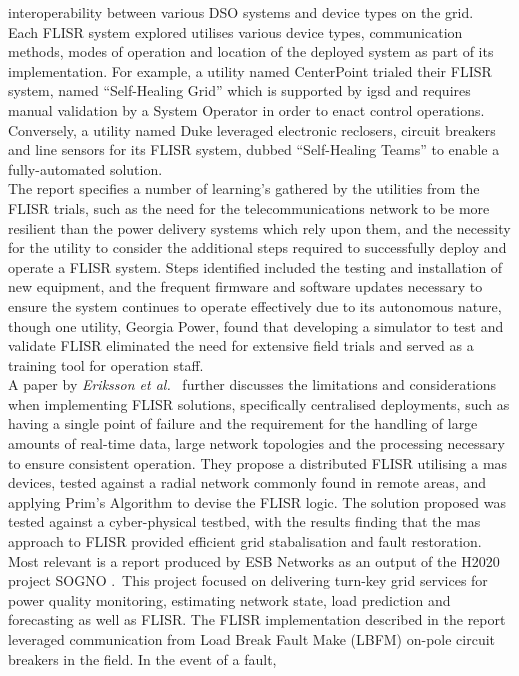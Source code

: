 interoperability between various DSO systems and device types on the grid.
\\
Each FLISR system explored utilises various device types, communication methods, modes of operation and location of the deployed system
as part of its implementation. For example, a utility named CenterPoint trialed their FLISR system, named ``Self-Healing Grid'' which is supported by \ac{igsd} and requires manual validation by a
System Operator in order to enact control operations. Conversely, a utility named Duke leveraged electronic reclosers, circuit breakers and line sensors for its FLISR system, dubbed ``Self-Healing Teams'' to enable a fully-automated solution.
\\
The report specifies a number of learning's gathered by the utilities from the FLISR trials, such as the need for the telecommunications network to be more resilient than the power delivery systems which rely upon them, and the necessity for
the utility to consider the additional steps required to successfully deploy and operate a FLISR system. Steps identified included the testing and installation of new equipment, and the frequent firmware and software updates necessary to ensure the system continues to operate
effectively due to its autonomous nature, though one utility, Georgia Power, found that developing a simulator to test and validate FLISR eliminated the need for extensive field trials and served as a training tool for operation staff.
\\
A paper by \textit{Eriksson et al.}\ \cite{7000578} further discusses the limitations and considerations when implementing FLISR solutions, specifically centralised deployments, such as having a single point of failure and the requirement for the handling of large amounts of real-time data, large network topologies and the processing necessary to ensure consistent operation. They propose a
distributed FLISR utilising a \ac{mas} devices, tested against a radial network commonly found in remote areas, and applying Prim's Algorithm to devise the FLISR logic. The solution proposed was tested against a
cyber-physical testbed, with the results finding that the \acs{mas} approach to FLISR provided efficient grid stabalisation and fault restoration.
\\
Most relevant is a report produced by ESB Networks as an output of the H2020 project SOGNO \cite{sogno_report}.\ This project focused on delivering turn-key grid services for power quality monitoring, estimating network state,
load prediction and forecasting as well as FLISR. The FLISR implementation described in the report leveraged communication from Load Break Fault Make (LBFM) on-pole circuit breakers in the field. In the event of a fault,
